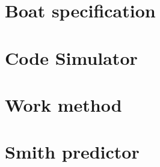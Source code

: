 \section{Boat specification}



\section{Code Simulator}

\section{Work method}

\section{Smith predictor}